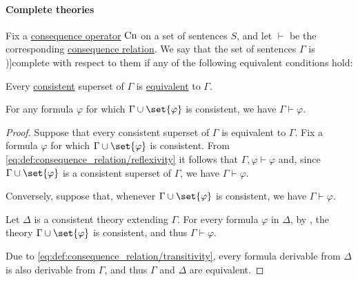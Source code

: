\paragraph{Complete theories}

\begin{definition}\label{def:complete_set_of_sentences}
  Fix a \hyperref[def:consequence_operator]{consequence operator} \( \op{Cn} \) on a set of sentences \( S \), and let \( {\vdash} \) be the corresponding \hyperref[def:consequence_relation]{consequence relation}. We say that the set of sentences \( \Gamma \) is \term[ru=полное (множество формул) (\cite[def. 1.3.16]{Герасимов2011Вычислимость})]{complete} with respect to them if any of the following equivalent conditions hold:
  \begin{thmenum}
     Every \hyperref[def:consistent_set_of_sentences]{consistent} superset of \( \Gamma \) is \hyperref[def:logical_theory/equivalent]{equivalent} to \( \Gamma \).

     For any formula \( \varphi \) for which \( \Gamma \cup \set{ \varphi } \) is consistent, we have \( \Gamma \vdash \varphi \).
  \end{thmenum}
\end{definition}
\begin{proof}
   Suppose that every consistent superset of \( \Gamma \) is equivalent to \( \Gamma \). Fix a formula \( \varphi \) for which \( \Gamma \cup \set{ \varphi } \) is consistent. From \eqref{eq:def:consequence_relation/reflexivity} it follows that \( \Gamma, \varphi \vdash \varphi \) and, since \( \Gamma \cup \set{ \varphi } \) is a consistent superset of \( \Gamma \), we have \( \Gamma \vdash \varphi \).

   Conversely, suppose that, whenever \( \Gamma \cup \set{ \varphi } \) is consistent, we have \( \Gamma \vdash \varphi \).

  Let \( \Delta \) is a consistent theory extending \( \Gamma \). For every formula \( \varphi \) in \( \Delta \), by , the theory \( \Gamma \cup \set{ \varphi } \) is consistent, and thus \( \Gamma \vdash \varphi \).

  Due to \eqref{eq:def:consequence_relation/transitivity}, every formula derivable from \( \Delta \) is also derivable from \( \Gamma \), and thus \( \Gamma \) and \( \Delta \) are equivalent.
\end{proof}


